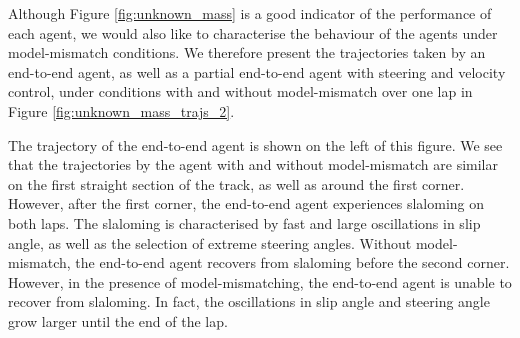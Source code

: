 

%     

Although Figure \ref{fig:unknown_mass} is a good indicator of the performance of each agent, we would also like to characterise the behaviour of the agents under model-mismatch conditions.
We therefore present the trajectories taken by an end-to-end agent, as well as a partial end-to-end agent with steering and velocity control, under conditions with and without model-mismatch over one lap in Figure \ref{fig:unknown_mass_trajs_2}.

The trajectory of the end-to-end agent is shown on the left of this figure. 
We see that the trajectories by the agent with and without model-mismatch are similar on the first straight section of the track, as well as around the first corner.
However, after the first corner, the end-to-end agent experiences slaloming on both laps.
The slaloming is characterised by fast and large oscillations in slip angle, as well as the selection of extreme steering angles.
Without model-mismatch, the end-to-end agent recovers from slaloming before the second corner.
However, in the presence of model-mismatching, the end-to-end agent is unable to recover from slaloming.
In fact, the oscillations in slip angle and steering angle grow larger until the end of the lap.

